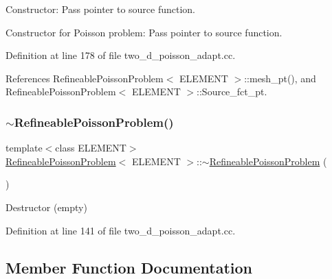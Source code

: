 Constructor\+: Pass pointer to source function. 

Constructor for Poisson problem\+: Pass pointer to source function. 

Definition at line 178 of file two\+\_\+d\+\_\+poisson\+\_\+adapt.\+cc.



References Refineable\+Poisson\+Problem$<$ E\+L\+E\+M\+E\+N\+T $>$\+::mesh\+\_\+pt(), and Refineable\+Poisson\+Problem$<$ E\+L\+E\+M\+E\+N\+T $>$\+::\+Source\+\_\+fct\+\_\+pt.

\mbox{\label{classRefineablePoissonProblem_a84980680d8a6576e14af42a8639d391a}} 
\subsubsection{\texorpdfstring{$\sim$\+Refineable\+Poisson\+Problem()}{~RefineablePoissonProblem()}}
{\footnotesize\ttfamily template$<$class E\+L\+E\+M\+E\+NT$>$ \\
\hyperlink{classRefineablePoissonProblem}{Refineable\+Poisson\+Problem}$<$ E\+L\+E\+M\+E\+NT $>$\+::$\sim$\hyperlink{classRefineablePoissonProblem}{Refineable\+Poisson\+Problem} (\begin{DoxyParamCaption}{ }\end{DoxyParamCaption})\hspace{0.3cm}{\ttfamily [inline]}}



Destructor (empty) 



Definition at line 141 of file two\+\_\+d\+\_\+poisson\+\_\+adapt.\+cc.



\subsection{Member Function Documentation}
\mbox{\label{classRefineablePoissonProblem_ac4d433dad09bce5bd9be21e86d347e38}} 
